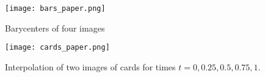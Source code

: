\begin{figure}[h]
	\centering
	\texttt{[image: bars\_paper.png]}
	\caption{Barycenters of four images}
	\label{barp}
\end{figure}
\begin{figure}[h]
	\centering
	\texttt{[image: cards\_paper.png]}
	\caption{Interpolation of two images of cards for times $t = 0, 0.25, 0.5, 0.75, 1$.}
	\label{cardp}
\end{figure}
